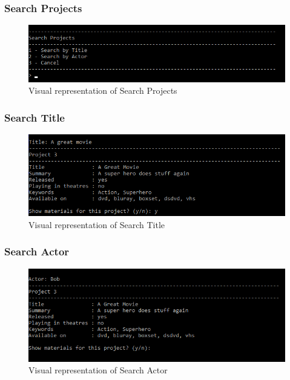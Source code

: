 \documentclass[
  english,
  a4paper,
,tablecaptionabove
]{scrartcl}
\begin{document}
\newpage

\hypertarget{search-projects}{%
\subsubsection{Search Projects}\label{search-projects}}

\begin{figure}
\centering
\includegraphics{images/ui-screenshots/search-projects.png}
\caption{Visual representation of Search Projects}
\end{figure}

\newpage

\hypertarget{search-title}{%
\subsubsection{Search Title}\label{search-title}}

\begin{figure}
\centering
\includegraphics{images/ui-screenshots/search-title.png}
\caption{Visual representation of Search Title}
\end{figure}

\newpage

\hypertarget{search-actor}{%
\subsubsection{Search Actor}\label{search-actor}}

\begin{figure}
\centering
\includegraphics{images/ui-screenshots/search-actor.png}
\caption{Visual representation of Search Actor}
\end{figure}
\end{document}
